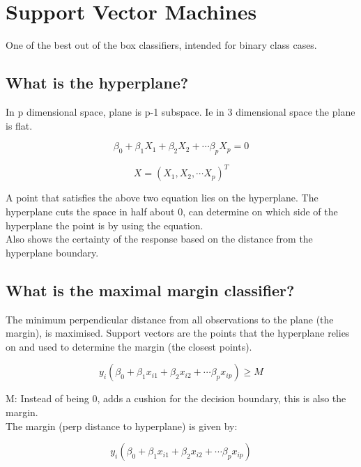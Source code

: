 \documentclass[11pt]{scrartcl} %
\begin{document}
\section{Support Vector Machines}

One of the best out of the box classifiers, intended for binary class cases.

\subsection{What is the hyperplane?}

In p dimensional space, plane is p-1 subspace. Ie in 3 dimensional space the plane is flat.

\begin{equation}
	\beta_0 + \beta_1X_1 + \beta_2X_2 + \cdots \beta_pX_p = 0
\end{equation}

\begin{equation}
	X = (X_1,X_2,\cdots X_p)^T
\end{equation}

A point that satisfies the above two equation lies on the hyperplane. The hyperplane cuts the space
in half about 0, can determine on which side of the hyperplane the point is by using the equation.\\

Also shows the certainty of the response based on the distance from the hyperplane boundary.

\subsection{What is the maximal margin classifier?}

The minimum perpendicular distance from all observations to the plane (the margin), is maximised. Support vectors
are the points that the hyperplane relies on and used to determine the margin (the closest points).

\begin{equation}
	y_i(\beta_0+\beta_1x_{i1}+\beta_2x_{i2}+\cdots \beta_px_{ip}) \geq M
\end{equation}

M: Instead of being 0, adds a cushion for the decision boundary, this is also the margin.\\

The margin (perp distance to hyperplane) is given by:

\begin{equation}
	y_i(\beta_0+\beta_1x_{i1}+\beta_2x_{i2}+\cdots \beta_px_{ip})
\end{equation}
\end{document}
